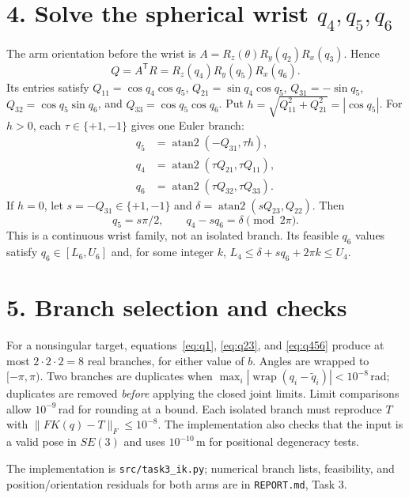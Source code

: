 \documentclass[10pt,a4paper]{article}
\begin{document}
\section*{4. Solve the spherical wrist $q_4,q_5,q_6$}
The arm orientation before the wrist is
$A=R_z(\theta)R_y(q_2)R_x(q_3)$. Hence
\begin{equation}
Q=A^\mathsf{T}R=R_z(q_4)R_y(q_5)R_x(q_6).
\label{eq:Q}
\end{equation}
Its entries satisfy
$Q_{11}=\cos q_4\cos q_5$, $Q_{21}=\sin q_4\cos q_5$,
$Q_{31}=-\sin q_5$, $Q_{32}=\cos q_5\sin q_6$, and
$Q_{33}=\cos q_5\cos q_6$. Put
$h=\sqrt{Q_{11}^2+Q_{21}^2}=|\cos q_5|$. For $h>0$, each
$\tau\in\{+1,-1\}$ gives one Euler branch:
\begin{equation}
\begin{aligned}
q_5&=\operatorname{atan2}(-Q_{31},\tau h),\\
q_4&=\operatorname{atan2}(\tau Q_{21},\tau Q_{11}),\\
q_6&=\operatorname{atan2}(\tau Q_{32},\tau Q_{33}).
\end{aligned}
\label{eq:q456}
\end{equation}
If $h=0$, let $s=-Q_{31}\in\{+1,-1\}$ and
$\delta=\operatorname{atan2}(sQ_{23},Q_{22})$. Then
\begin{equation}
q_5=s\pi/2,\qquad q_4-sq_6=\delta\pmod{2\pi}.
\label{eq:wristfamily}
\end{equation}
This is a continuous wrist family, not an isolated branch. Its feasible
$q_6$ values satisfy $q_6\in[L_6,U_6]$ and, for some integer $k$,
$L_4\leq\delta+s q_6+2\pi k\leq U_4$.

\section*{5. Branch selection and checks}
For a nonsingular target, equations~\eqref{eq:q1}, \eqref{eq:q23}, and
\eqref{eq:q456} produce at most $2\cdot2\cdot2=8$ real branches, for either
value of $b$. Angles are wrapped to $[-\pi,\pi)$. Two branches are duplicates
when $\max_i|\operatorname{wrap}(q_i-\tilde q_i)|<10^{-8}$\,rad; duplicates
are removed \emph{before} applying the closed joint limits. Limit comparisons
allow $10^{-9}$\,rad for rounding at a bound. Each isolated branch must
reproduce $T$ with $\|FK(q)-T\|_F\leq10^{-8}$. The implementation also checks
that the input is a valid pose in $SE(3)$ and uses $10^{-10}$\,m for positional
degeneracy tests.

The implementation is \texttt{src/task3\_ik.py}; numerical branch lists,
feasibility, and position/orientation residuals for both arms are in
\texttt{REPORT.md}, Task 3.
\end{document}
